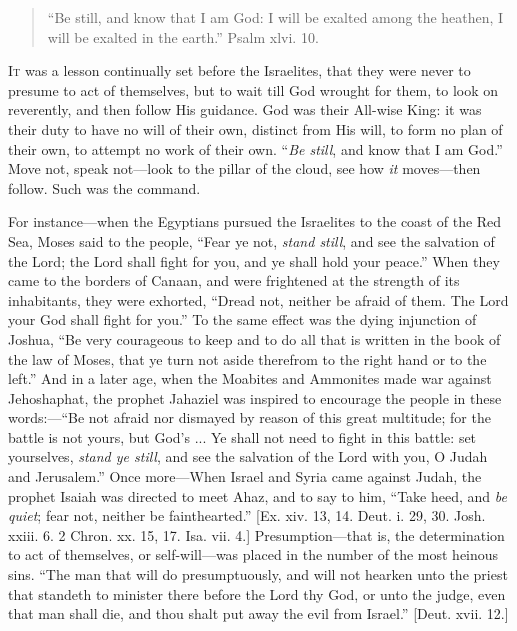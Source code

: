 
\begin{quote}

``Be still, and know that I am God: I will be exalted among
the heathen, I will be exalted in the earth.'' Psalm xlvi. 10.

\end{quote}

I\textsc{t} was a lesson continually set before the Israelites, that they
were never to presume to act of themselves, but to wait till God
wrought for them, to look on reverently, and then follow His guidance.
God was their All-wise King: it was their duty to have no will of
their own, distinct from His will, to form no plan of their own, to
attempt no work of their own. ``\emph{Be still}, and know that I
am God.'' Move not, speak not—look to the pillar of the cloud,
see how \emph{it} moves—then follow. Such was the command.

For instance—when the Egyptians pursued the Israelites to the
coast of the Red Sea, Moses said to the people, ``Fear ye not, \emph{stand
still}, and see the salvation of the Lord; the Lord shall fight for
you, and ye shall hold your peace.'' When they came to the borders
of Canaan, and were frightened at the strength of its inhabitants,
they were exhorted, ``Dread not, neither be afraid of them. The
Lord your God shall fight for you.'' To the same effect was the
dying injunction of Joshua, ``Be very courageous to keep and to do
all that is written in the book of the law of Moses, that ye turn not
aside therefrom to the right hand or to the left.'' And in a later
age, when the Moabites and Ammonites made war against Jehoshaphat, the
prophet Jahaziel was inspired to encourage the people in these words:—``Be
not afraid nor dismayed by reason of this great multitude; for the
battle is not yours, but God's ... Ye shall not need to fight in
this battle: set yourselves, \emph{stand ye still}, and see the
salvation of the Lord with you, O Judah and Jerusalem.'' Once more—When
Israel and Syria came against Judah, the prophet Isaiah was directed
to meet Ahaz, and to say to him, ``Take heed, and \emph{be quiet};
fear not, neither be fainthearted.'' [Ex. xiv. 13, 14. Deut. i.
29, 30. Josh. xxiii. 6. 2 Chron. xx. 15, 17. Isa. vii. 4.] Presumption—that
is, the determination to act of themselves, or self-will—was placed
in the number of the most heinous sins. ``The man that will do
presumptuously, and will not hearken unto the priest that standeth to
minister there before the Lord thy God, or unto the judge, even that
man shall die, and thou shalt put away the evil from Israel.''
[Deut. xvii. 12.]

